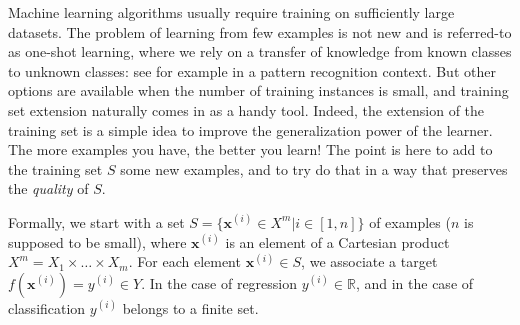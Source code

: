 Machine learning algorithms usually require training on sufficiently large
datasets. The problem of learning from few examples is not new and is
referred-to as one-shot learning, where we rely on a transfer of knowledge from
known classes to unknown classes: see  for example \cite{LiFerPerPAMI06} in a
pattern recognition context.  But other options are available when the number
of training instances is small, and training set extension naturally comes in
as a handy tool. Indeed, the extension of the training set is a simple idea to
improve the generalization power of the learner.  The more examples you have, the
better you learn! The point is here to add to the training set $S$ some new
examples, and to try do that in a way that preserves the \textit{quality} of
$S$.

Formally, we start with a set $S= \{\mathbf{x}^{(i)} \in X^m| i \in
[1,n]\}$ of examples ($n$ is supposed to be small), where $\mathbf{x}^{(i)}$ is
an element of a Cartesian product $X^m = X_1 \times \ldots \times X_m$.
For each element  $\mathbf{x}^{(i)} \in S$, we associate a target
$f(\mathbf{x}^{(i)})=y^{(i)} \in Y$.  In the case of regression $y^{(i)} \in
\mathbb{R}$, and in the case of classification $y^{(i)}$ belongs to a finite
set.


